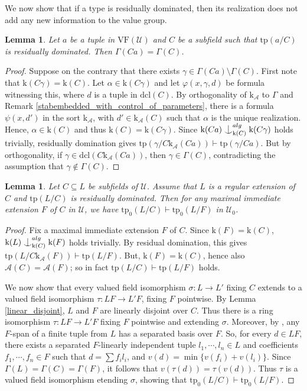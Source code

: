 \documentclass[12pt]{article}
\newcommand{\tpp}{\mathrm{tp}}
\newcommand{\dcl}{\mathrm{dcl}}
\newcommand{\val}{\textit{v}}
\newcommand{\0}{\emptyset}
\newcommand{\vf}{\mathrm{VF}}
\newcommand{\rf}{\mathrm{k}}
\newcommand{\A}{\mathcal{A}}
\newcommand{\U}{\mathcal{U}}
\newcommand{\Ualg}{\mathcal{U}_0}
\def\forkindep{\mathrel{\raise0.2ex\hbox{\ooalign{\hidewidth$\vert$\hidewidth\cr\raise-0.9ex\hbox{$\smile$}}}}}
\theoremstyle{plain}%
\newtheorem{lem}[thm]{Lemma}
\theoremstyle{definition}
\theoremstyle{remark}
\begin{document}
We now show that if a type is residually dominated, then its realization does not add any new information to the value group.

\begin{lem}\label{initial_orthogonal_to_Gamma}
    Let $a$ be a tuple in $\vf(\U)$ and $C$ be a subfield such that $\tpp(a/C)$ is residually dominated. Then $\Gamma(Ca)=\Gamma(C)$.
\end{lem}

\begin{proof}
    Suppose on the contrary that there exists $\gamma \in \Gamma(Ca) \setminus \Gamma(C)$. First note that $\rf(C\gamma)=\rf(C)$. Let $\alpha\in \rf(C\gamma)$ and let $\varphi(x,\gamma,d)$ be formula witnessing this, where $d$ is a tuple in $\dcl(C)$. 
    By orthogonality of $\rf_{\mathcal{A}}$ to $\Gamma$ and Remark \ref{stabembedded_with_control_of_parameters}, there is a formula $\psi(x,d')$ in the sort $\rf_{\A}$, with $d'\in \rf_{\A}(C)$ such that $\alpha$ is the unique realization. 
    Hence, $\alpha\in \rf(C)$ and thus $\rf(C)=\rf(C\gamma)$.
   Since $\rf(Ca) \forkindep_{\rf(C)}^{alg} \rf(C\gamma)$ holds trivially, residually domination gives $\tpp(\gamma / C \rf_{\mathcal{A}}(Ca)) \vdash \tpp(\gamma / Ca)$. But by orthogonality, if $\gamma \in \dcl(C \rf_{\mathcal{A}}(Ca))$, then $\gamma \in \Gamma(C)$, contradicting the assumption that $\gamma\not\in \Gamma(C)$.\end{proof}

\begin{lem}\label{separated_basis} Let $C\subseteq L$ be subfields of $\U$. Assume that $L$ is a regular extension of $C$ and $\tpp(L/C)$ is residually dominated. Then for any maximal immediate extension $F$ of $C$ in $\U$, we have $\tpp_0(L/C)\vdash \tpp_0(L/F)$ in $\Ualg$.
\end{lem}
\begin{proof} Fix a maximal immediate extension $F$ of $C$. 
Since $\rf(F)=\rf(C)$, $\rf(L)\forkindep_{\rf(C)}^{alg}\rf(F)$ holds trivially. 
By residual domination, this gives $\tpp(L/C\rf_{\A}(F))\vdash \tpp(L/F)$. But, $\rf(F)=\rf(C)$, hence also $\A(C)=\A(F)$; so in fact $\tpp(L/C)\vdash \tpp(L/F)$ holds. %

We now show that every valued field isomorphism $\sigma: L\to L'$ fixing $C$ extends to a valued field isomorphism $\tau: LF\to L'F$, fixing $F$ pointwise. 
By Lemma \ref{linear_disjoint}, $L$ and $F$ are linearly disjoint over $C$. Thus there is a ring isomorphism $\tau: LF\to L'F$ fixing $F$ pointwise and extending $\sigma$.
Moreover, by \cite[Proposition 12.1]{HHM08}, any $F$-span of a finite tuple from $L$ has a separated basis over $F$. So, for every $d\in LF$, there exists a separated $F$-linearly independent tuple $l_1,\cdots, l_n \in L$ and coefficients $f_1,\cdots, f_n \in F$ such that $d=\sum f_i l_i$, and $\val(d)=\min\{ \val(f_i)+\val(l_i)\}$. Since $\Gamma(L)=\Gamma(C)=\Gamma(F)$, it follows that $\val(\tau(d))=\tau(\val(d))$. Thus $\tau$ is a valued field isomorphism etending $\sigma$, showing that $\tpp_0(L/C)\vdash \tpp_0(L/F)$.
\end{proof}
\end{document}
